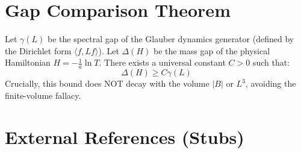 \section{Gap Comparison Theorem}

\begin{theorem}
\label{thm:canonical_gap_comparison}
Let $\gamma(L)$ be the spectral gap of the Glauber dynamics generator (defined by the Dirichlet form $\langle f, Lf \rangle$). Let $\Delta(H)$ be the mass gap of the physical Hamiltonian $H = -\frac{1}{a} \ln T$.
There exists a universal constant $C > 0$ such that:
\begin{equation}
\Delta(H) \ge C \gamma(L)
\end{equation}
Crucially, this bound does NOT decay with the volume $|B|$ or $L^3$, avoiding the finite-volume fallacy.
\end{theorem}

\section{External References (Stubs)}
\label{thm:full-os}
\label{thm:persistent-gap}
\label{thm:spectral-continuum}
\label{thm:hessian_positivity}
